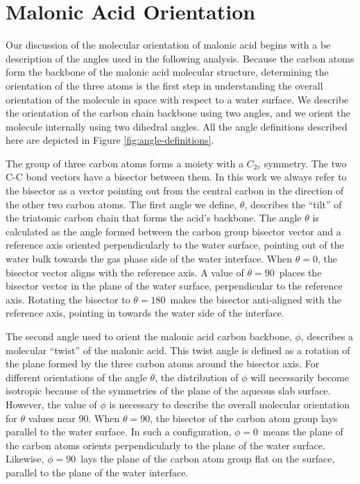\section{Malonic Acid Orientation}

Our discussion of the molecular orientation of malonic acid begins with a be description of the angles used in the following analysis. Because the carbon atoms form the backbone of the malonic acid molecular structure, determining the orientation of the three atoms is the first step in understanding the overall orientation of the molecule in space with respect to a water surface.  We describe the orientation of the carbon chain backbone using two angles, and we orient the molecule internally using two dihedral angles.  All the angle definitions described here are depicted in Figure \ref{fig:angle-definitions}. 

The group of three carbon atoms forms a moiety with a $C_{2v}$ symmetry.  The two C-C bond vectors have a bisector between them.  In this work we always refer to the bisector as a vector pointing out from the central carbon in the direction of the other two carbon atoms.  The first angle we define, $\theta$, describes the ``tilt'' of the triatomic carbon chain that forms the acid's backbone. The angle $\theta$ is calculated as the angle formed between the carbon group bisector vector and a reference axis oriented perpendicularly to the water surface, pointing out of the water bulk towards the gas phase side of the water interface. When $\theta = 0$\textdegree, the bisector vector aligns with the reference axis. A value of $\theta=90$\textdegree~places the bisector vector in the plane of the water surface, perpendicular to the reference axis. Rotating the bisector to $\theta=180$\textdegree~makes the bisector anti-aligned with the reference axis, pointing in towards the water side of the interface.

The second angle used to orient the malonic acid carbon backbone, $\phi$, describes a molecular ``twist'' of the malonic acid. This twist angle is defined as a rotation of the plane formed by the three carbon atoms around the bisector axis. For different orientations of the angle $\theta$, the distribution of $\phi$ will necessarily become isotropic because of the symmetries of the plane of the aqueous slab surface. However, the value of $\phi$ is necessary to describe the overall molecular orientation for $\theta$ values near 90\textdegree. When $\theta = 90$\textdegree, the bisector of the carbon atom group lays parallel to the water surface. In such a configuration, $\phi = 0$\textdegree~means the plane of the carbon atoms orients perpendicularly to the plane of the water surface. Likewise, $\phi=90$\textdegree~lays the plane of the carbon atom group flat on the surface, parallel to the plane of the water interface.

